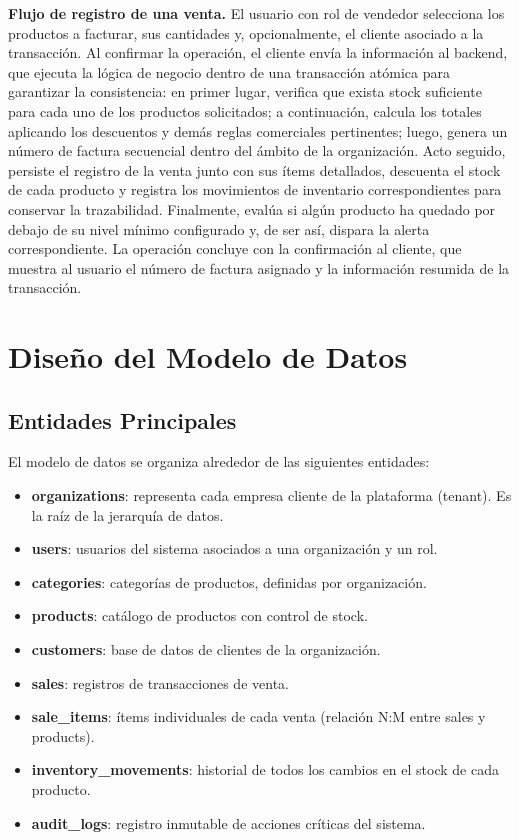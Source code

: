 \textbf{Flujo de registro de una venta.} El usuario con rol de vendedor selecciona los productos a facturar, sus cantidades y, opcionalmente, el cliente asociado a la transacción. Al confirmar la operación, el cliente envía la información al backend, que ejecuta la lógica de negocio dentro de una transacción atómica para garantizar la consistencia: en primer lugar, verifica que exista stock suficiente para cada uno de los productos solicitados; a continuación, calcula los totales aplicando los descuentos y demás reglas comerciales pertinentes; luego, genera un número de factura secuencial dentro del ámbito de la organización. Acto seguido, persiste el registro de la venta junto con sus ítems detallados, descuenta el stock de cada producto y registra los movimientos de inventario correspondientes para conservar la trazabilidad. Finalmente, evalúa si algún producto ha quedado por debajo de su nivel mínimo configurado y, de ser así, dispara la alerta correspondiente. La operación concluye con la confirmación al cliente, que muestra al usuario el número de factura asignado y la información resumida de la transacción.

\section{Diseño del Modelo de Datos}\label{diseuxf1o-del-modelo-de-datos}

\subsection{Entidades Principales}\label{entidades-principales}

El modelo de datos se organiza alrededor de las siguientes entidades:

\begin{itemize}
\tightlist
\item
  \textbf{organizations}: representa cada empresa cliente de la plataforma (tenant). Es la raíz de la jerarquía de datos.
\item
  \textbf{users}: usuarios del sistema asociados a una organización y un rol.
\item
  \textbf{categories}: categorías de productos, definidas por organización.
\item
  \textbf{products}: catálogo de productos con control de stock.
\item
  \textbf{customers}: base de datos de clientes de la organización.
\item
  \textbf{sales}: registros de transacciones de venta.
\item
  \textbf{sale\_items}: ítems individuales de cada venta (relación N:M entre sales y products).
\item
  \textbf{inventory\_movements}: historial de todos los cambios en el stock de cada producto.
\item
  \textbf{audit\_logs}: registro inmutable de acciones críticas del sistema.
\end{itemize}

